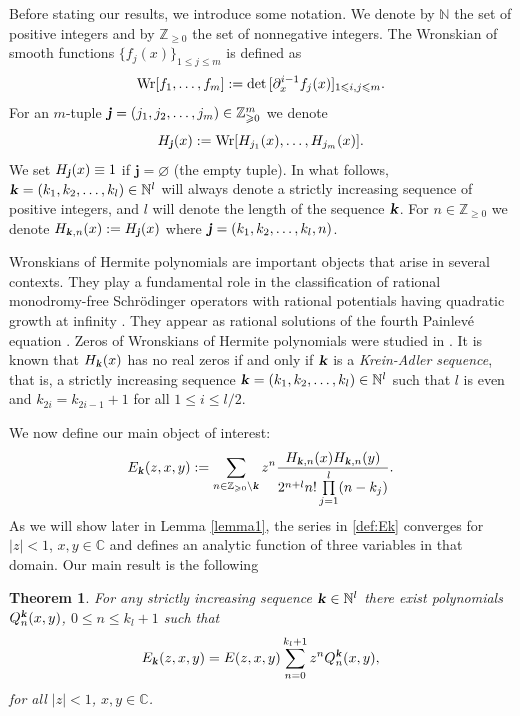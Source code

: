 \documentclass[12pt]{article}
\def\wr{\textnormal{Wr}}
\def\c{{\mathbb C}}
\def\z{{\mathbb Z}}
\def\n{{\mathbb N}}
\def\k{\textbf{\textsl{k}}}
\def\j{\textbf{\textsl{j}}}
\newtheorem{theorem}{Theorem}
\begin{document}
Before stating our results, we introduce some notation. We denote by $\n$ the set of positive integers and by $\z_{\geqslant 0}$ the set of nonnegative integers. The Wronskian of smooth functions $\{f_j(x)\}_{1\leqslant j \leqslant m}$ is defined as 
\[
\wr[f_1,\dots,f_m]:=\det\,[\partial_x^{i-1} f_j(x)]_{1\leqslant i,j \leqslant m}.
\]  
For an $m$-tuple $\j=(j_1,j_2,\dots,j_m) \in \z_{\geqslant 0}^m$ we denote
\[
H_{\j}(x):=\wr[H_{j_1}(x), \dots,H_{j_m}(x)].
\]
We set $H_{\j}(x) \equiv 1$ if ${\mathbf j}=\varnothing$ (the empty tuple). 
In what follows, $\k=(k_1,k_2,\dots,k_l)\in \n^l$ will always denote a strictly increasing sequence of positive integers, and $l$ will denote  the length of the sequence $\k$. For $n\in \z_{\geqslant 0}$ we denote $H_{\k,n}(x):=H_{\j}(x)$  where $\j=(k_1,k_2,\dots,k_l,n)$. 

Wronskians of Hermite polynomials are important objects that arise in several contexts.  They play a fundamental role in the classification of rational monodromy-free Schr\"odinger operators with rational potentials having quadratic growth at infinity \cite{Oblomkov1999}. They appear as rational solutions of the fourth Painlev\'e equation \cite{Gomez2021}. Zeros of Wronskians of Hermite polynomials were studied in \cite{Felder2012}. It is known \cite{Adler1994} that $H_{\k}(x)$ has no real zeros if and only if $\k$ is a {\it Krein-Adler sequence}, that is, a strictly increasing sequence   $\k=(k_1,k_2,\dots, k_l) \in \n^l$ such that $l$ is even and  $k_{2i}=k_{2i-1}+1$ for all $1\leqslant i \leqslant l/2$.


We now define our main object of interest: 
\begin{equation}\label{def:Ek}
E_{\k}(z,x,y):=\sum\limits_{n \in \z_{\geqslant 0} \setminus \k}  z^n \frac{H_{\k,n}(x) H_{\k,n}(y)}{2^{n+l} n! \prod\limits_{j=1}^l (n-k_j)}.
\end{equation} 
As we will show later in Lemma \ref{lemma1}, the series in \eqref{def:Ek} converges for $|z|<1$, $x,y\in \c$ and defines an analytic function of three variables in that domain. Our main result is the following
\begin{theorem}\label{thm_main}
For any strictly increasing sequence $\k \in \n^l$ there exist polynomials $Q^{\k}_n(x,y)$, $0\leqslant n \leqslant k_l+1$ such that 
\begin{equation}\label{eqn_main}
E_{\k}(z,x,y)=E(z,x,y) \sum\limits_{n=0}^{k_l+1} z^n Q^{\k}_n(x,y),
\end{equation}
for all $|z|<1$, $x,y\in \c$.
\end{theorem}
\end{document}
